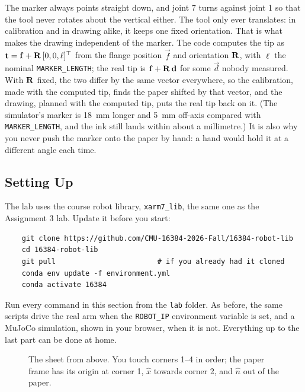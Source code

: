 \documentclass{16384_doc}
\begin{document}
The marker always points straight down, and joint 7 turns against joint 1 so
that the tool never rotates about the vertical either.  The tool only ever
translates: in calibration and in drawing alike, it keeps one fixed
orientation.  That is what makes the drawing independent of the marker.  The
code computes the tip as $\mathbf{t} = \mathbf{f} + \mathbf{R}\,[0, 0, \ell]^\top$ from the
flange position $\vec{f}$ and orientation $\mathbf{R}$, with $\ell$ the nominal
\verb!MARKER_LENGTH!; the real tip is $\mathbf{f} + \mathbf{R}\,\mathbf{d}$ for some
$\vec{d}$ nobody measured.  With $\mathbf{R}$ fixed, the two differ by the same
vector everywhere, so the calibration, made with the computed tip, finds the
paper shifted by that vector, and the drawing, planned with the computed tip,
puts the real tip back on it.  (The simulator's marker is 18~mm longer and 5~mm
off-axis compared with \verb!MARKER_LENGTH!, and the ink still lands within
about a millimetre.)  It is also why you never push the marker onto the paper
by hand: a hand would hold it at a different angle each time.

\subsection{Setting Up}

The lab uses the course robot library, \verb!xarm7_lib!, the same one as the
Assignment 3 lab.  Update it before you start:
\begin{verbatim}
    git clone https://github.com/CMU-16384-2026-Fall/16384-robot-lib
    cd 16384-robot-lib
    git pull                        # if you already had it cloned
    conda env update -f environment.yml
    conda activate 16384
\end{verbatim}
Run every command in this section from the \verb!lab! folder.  As before, the
same scripts drive the real arm when the \verb!ROBOT_IP! environment variable is
set, and a MuJoCo simulation, shown in your browser, when it is not.  Everything
up to the last part can be done at home.

\begin{figure}[h]
\centering
{}
\caption{The sheet from above.  You touch corners 1--4 in order; the paper
frame has its origin at corner 1, $\hat{x}$ towards corner 2, and $\hat{n}$ out of
the paper.}
\label{fig:paper}
\end{figure}
\end{document}
